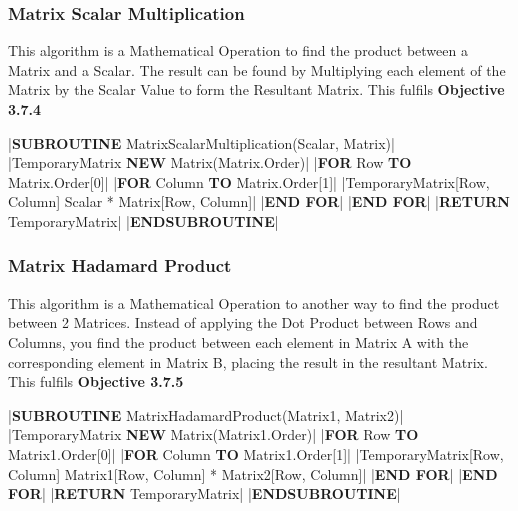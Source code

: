 \begin{flushleft}
                \vspace{0.5cm}
            \subsubsection{Matrix Scalar Multiplication}
                This algorithm is a Mathematical Operation to find the product between a Matrix and a Scalar.
                The result can be found by Multiplying each element of the Matrix by the Scalar Value to form the Resultant 
                Matrix. This fulfils \textbf{Objective 3.7.4}

                \vspace{0.2cm}
                \begin{pseudocode}
|\textbf{SUBROUTINE} MatrixScalarMultiplication(Scalar, Matrix)|
    |TemporaryMatrix \leftarrow \textbf{NEW} Matrix(Matrix.Order)|
    |\textbf{FOR} Row  \textbf{TO} Matrix.Order[0]|
        |\textbf{FOR} Column  \textbf{TO} Matrix.Order[1]|
            |TemporaryMatrix[Row, Column] \leftarrow Scalar * Matrix[Row, Column]|
        |\textbf{END FOR}|
    |\textbf{END FOR}|
    |\textbf{RETURN} TemporaryMatrix|
|\textbf{ENDSUBROUTINE}|
                \end{pseudocode}   
                
                \vspace{0.5cm}
            \subsubsection{Matrix Hadamard Product}
                This algorithm is a Mathematical Operation to another way to find the product between 2 Matrices. Instead of
                applying the Dot Product between Rows and Columns, you find the product between each element in Matrix A
                with the corresponding element in Matrix B, placing the result in the resultant Matrix. This fulfils \textbf{Objective 3.7.5}

                \vspace{0.2cm}
                \begin{pseudocode}
|\textbf{SUBROUTINE} MatrixHadamardProduct(Matrix1, Matrix2)|
    |TemporaryMatrix \leftarrow \textbf{NEW} Matrix(Matrix1.Order)|
    |\textbf{FOR} Row  \textbf{TO} Matrix1.Order[0]|
        |\textbf{FOR} Column  \textbf{TO} Matrix1.Order[1]|
            |TemporaryMatrix[Row, Column] \leftarrow Matrix1[Row, Column] * Matrix2[Row, Column]|
        |\textbf{END FOR}|
    |\textbf{END FOR}|
    |\textbf{RETURN} TemporaryMatrix|
|\textbf{ENDSUBROUTINE}|
                \end{pseudocode}   


\end{flushleft}
